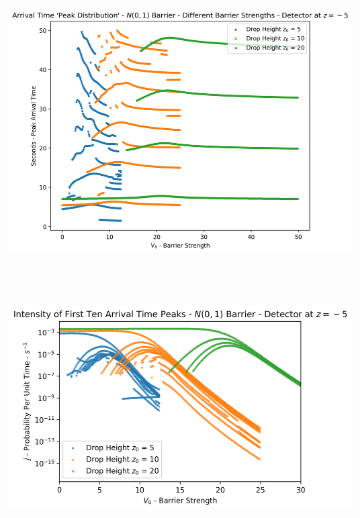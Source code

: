 \begin{figure}
    \centering
    \begin{subfigure}[b]{1\linewidth}
        \includegraphics[width=\linewidth]{Figures//Yoshida/3444d7de-b27d-4a56-9831-5486c5e74929.png}
        \caption{}
    \end{subfigure}
    \\
    \begin{subfigure}[b]{1\linewidth}
        \includegraphics[width=\linewidth]{Figures//Yoshida/e3ca365e-0e36-49bf-87a0-363c8a26e34f.png}
        \caption{}
    \end{subfigure}
    \\
    \begin{subfigure}[b]{1\linewidth}

\end{subfigure}
\end{figure}

